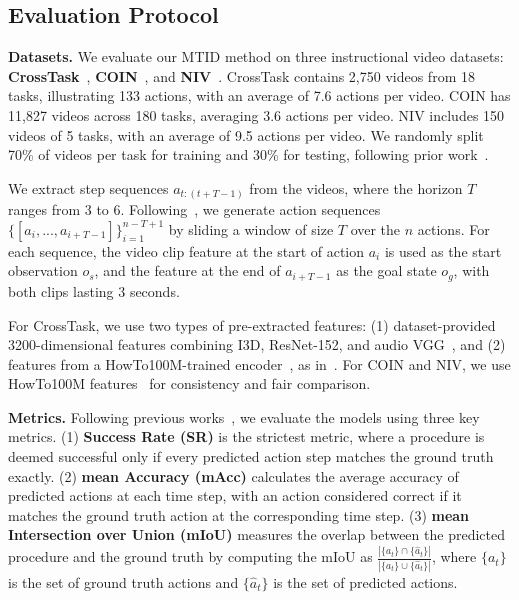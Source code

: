 
\subsection{Evaluation Protocol}
\label{sec:protocal}
\textbf{Datasets.} We evaluate our MTID method on three instructional video datasets: \textbf{CrossTask}~\citep{zhukov2019cross}, \textbf{COIN}~\citep{tang2019coin}, and \textbf{NIV}~\citep{alayrac2016unsupervised}. CrossTask contains 2,750 videos from 18 tasks, illustrating 133 actions, with an average of 7.6 actions per video. COIN has 11,827 videos across 180 tasks, averaging 3.6 actions per video. NIV includes 150 videos of 5 tasks, with an average of 9.5 actions per video. We randomly split 70\% of videos per task for training and 30\% for testing, following prior work~\citep{sun2022plate, wang2023pdpp, niu2024schema}.

We extract step sequences $a_{t:(t+T-1)}$ from the videos, where the horizon $T$ ranges from 3 to 6. Following~\citep{zhao2022p3iv,wang2023pdpp}, we generate action sequences $\{[a_i, ..., a_{i+T-1}]\}_{i=1}^{n-T+1}$ by sliding a window of size $T$ over the $n$ actions. For each sequence, the video clip feature at the start of action $a_i$ is used as the start observation $o_s$, and the feature at the end of $a_{i+T-1}$ as the goal state $o_g$, with both clips lasting 3 seconds.

For CrossTask, we use two types of pre-extracted features: (1) dataset-provided 3200-dimensional features combining I3D, ResNet-152, and audio VGG~\citep{carreira2017quo,he2016deep,hershey2017cnn}, and (2) features from a HowTo100M-trained encoder~\citep{miech2019howto100m}, as in~\citep{wang2023pdpp}. For COIN and NIV, we use HowTo100M features~\citep{wang2023pdpp} for consistency and fair comparison.

\textbf{Metrics.} Following previous works~\citep{sun2022plate, zhao2022p3iv, wang2023pdpp, niu2024schema, nagasinghe2024not}, we evaluate the models using three key metrics. (1) \textbf{Success Rate (SR)} is the strictest metric, where a procedure is deemed successful only if every predicted action step matches the ground truth exactly. (2) \textbf{mean Accuracy (mAcc)} calculates the average accuracy of predicted actions at each time step, with an action considered correct if it matches the ground truth action at the corresponding time step. (3) \textbf{mean Intersection over Union (mIoU)} measures the overlap between the predicted procedure and the ground truth by computing the mIoU as $\frac{|\{a_t\} \cap \{\hat{a}_t\}|}{|\{a_t\} \cup \{\hat{a}_t\}|}$, where $\{a_t\}$ is the set of ground truth actions and $\{\hat{a}_t\}$ is the set of predicted actions.

